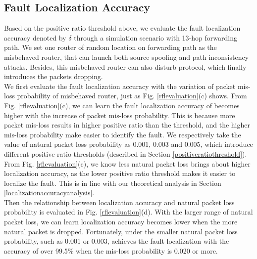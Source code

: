 \subsection{Fault Localization Accuracy}
\label{localizationaccuracy}
Based on the positive ratio threshold above, we evaluate the fault localization accuracy denoted by $\delta$ through a simulation scenario with 13-hop forwarding path. We set one router of random location on forwarding path as the misbehaved router, that can launch both source spoofing and path inconsistency attacks. Besides, this misbehaved router can also disturb \name{} protocol, which finally introduces the packets dropping.\\
\indent
We first evaluate the fault localization accuracy with the variation of packet mis-loss probability of misbehaved router, just as Fig. \ref{rflevaluation}(c) shows. From Fig. \ref{rflevaluation}(c), we can learn the fault localization accuracy of \name{} becomes higher with the increase of packet mis-loss probability. This is because more packet mis-loss results in higher positive ratio than the threshold, and the higher mis-loss probability make \name{} easier to identify the fault. We respectively take the value of natural packet loss probability as 0.001, 0.003 and 0.005, which introduce different positive ratio thresholds (described in Section \ref{positiveratiothreshold}). From Fig. \ref{rflevaluation}(c), we know less natural packet loss brings about higher localization accuracy, as the lower positive ratio threshold makes it easier to localize the fault. This is in line with our theoretical analysis in Section \ref{localizationaccuracyanalysis}.\\
\indent
Then the relationship between localization accuracy and natural packet loss probability is evaluated in Fig. \ref{rflevaluation}(d). With the larger range of natural packet loss, we can learn localization accuracy becomes lower when the more natural packet is dropped. Fortunately, under the smaller natural packet loss probability, such as 0.001 or 0.003, \name{} achieves the fault localization with the accuracy of over 99.5\% when the mis-loss probability is 0.020 or more.
